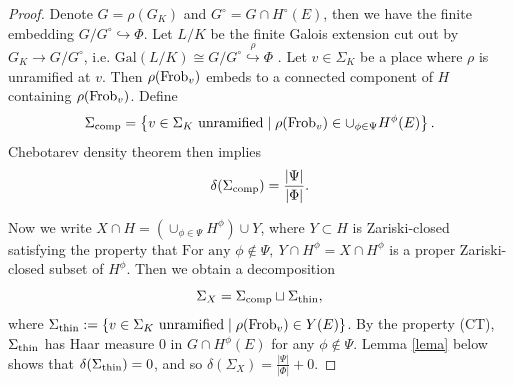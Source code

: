 \documentclass[20pt, oneside]{article}   	%
\theoremstyle{definition}
\newcommand{\Gal}{\mathrm{Gal}}
\begin{document}
\begin{proof}

Denote $G=\rho(G_K)$ and $G^\circ=G\cap H^\circ(E)$, then we have the finite embedding $G/G^\circ\hookrightarrow \Phi$. Let $L/K$ be the finite Galois extension cut out by $G_K\rightarrow G/G^\circ$, i.e. $\Gal(L/K)\cong G/G^\circ \stackrel{\rho}\hookrightarrow\Phi$ . Let $v\in \Sigma_K$ be a place where $\rho$ is unramified at $v$. Then $\rho({\rm Frob}_v)$ embeds to a connected component of $H$ containing $\rho({\rm Frob}_v)$. Define $$\Sigma_{\rm comp}=\left\{v\in\Sigma_K\ {\rm unramified }\mid \rho({\rm Frob}_v)\in\cup_{\phi\in\Psi}H^\phi(E)\right\}.$$
Chebotarev density theorem then implies $$\delta(\Sigma_{\rm comp})=\frac{|\Psi|}{|\Phi|}.$$


Now we write $X\cap H=\left(\cup_{\phi\in\Psi}H^\phi \right)\cup Y$, where $Y\subset H$ is Zariski-closed satisfying the property that $\textrm{For any }\phi\not\in\Psi,\ Y\cap H^\phi=X\cap H^\phi$ is a proper Zariski-closed subset of $H^\phi$. Then we obtain a decomposition $$\Sigma_X=\Sigma_{\rm comp}\sqcup \Sigma_{\rm thin},$$ where $\Sigma_{\rm thin}:=\left\{v\in \Sigma_K\ {\rm unramified}\mid \rho({\rm Frob}_v)\in Y(E)\right\}$. By the property (CT), $\Sigma_{\rm thin}$ has Haar measure $0$ in $G\cap H^\phi(E)$ for any $\phi\not\in\Psi$. Lemma \ref{lema} below shows that $\delta(\Sigma_{\rm thin})=0$, and so $\delta(\Sigma_X)=\frac{|\Psi|}{|\Phi|}+0$.

\end{proof}
\end{document}
